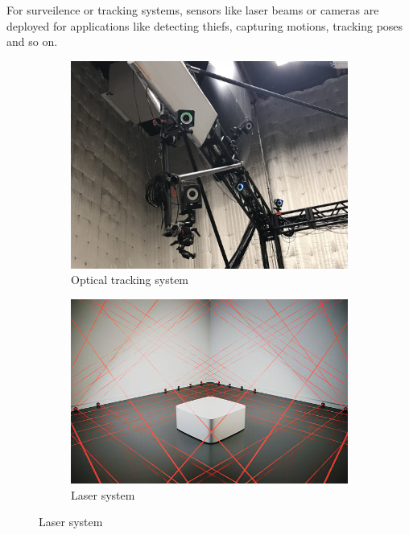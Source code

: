 For surveilence or tracking systems, 
sensors like laser beams or cameras are deployed for applications like detecting thiefs, 
capturing motions, tracking poses and so on. 
\begin{figure}[ht] 
    \centering 
    
    \begin{subfigure}[b]{0.41\textwidth} 
        \includegraphics[width=\textwidth]{figures/optitrack.jpg} 
        \caption{Optical tracking system} 
        \label{fig:intro-optitrack} 
    \end{subfigure} 
    \hfill
    \begin{subfigure} [b]{0.46\textwidth} 
        \includegraphics[width=\textwidth]{figures/laser.jpg} 
        \caption{Laser system} 
        \label{fig:intro-laser} 
    \end{subfigure} 
\end{figure}

